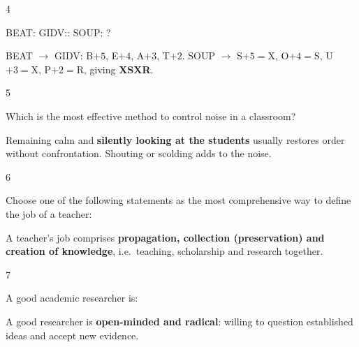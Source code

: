 \begin{question}{4}
{BEAT: GIDV:: SOUP: ?\par}
\begin{explain}
BEAT $\rightarrow$ GIDV: B$+5$, E$+4$, A$+3$, T$+2$.
SOUP $\rightarrow$ S$+5=$X, O$+4=$S, U$+3=$X, P$+2=$R, giving \textbf{XSXR}.
\end{explain}
\end{question}

\begin{question}{5}
{Which is the most effective method to control noise in a classroom?\par}
\begin{explain}
Remaining calm and \textbf{silently looking at the students} usually restores order without confrontation. Shouting or scolding adds to the noise.
\end{explain}
\end{question}

\begin{question}{6}
{Choose one of the following statements as the most comprehensive way to define the job of a teacher:\par}
\begin{explain}
A teacher's job comprises \textbf{propagation, collection (preservation) and creation of knowledge}, i.e.\ teaching, scholarship and research together.
\end{explain}
\end{question}

\begin{question}{7}
{A good academic researcher is:\par}
\begin{explain}
A good researcher is \textbf{open-minded and radical}: willing to question established ideas and accept new evidence.
\end{explain}
\end{question}

